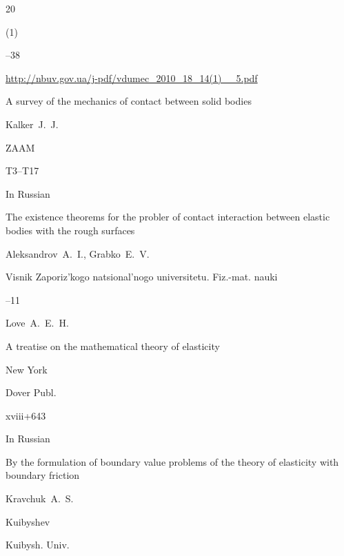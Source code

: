 \begin{thebibliography}{20}


(1)

--38

\elink \url{http://nbuv.gov.ua/j-pdf/vdumec_2010_18_14(1)__5.pdf}






\paper A survey of the mechanics of contact between solid bodies

\by Kalker~J.~J.

\jour ZAAM




\pages T3--T17





\lang In Russian

\paper The existence theorems for the probler of contact interaction between elastic bodies with the rough surfaces

\by Aleksandrov~A.~I., Grabko~E.~V.

\jour Visnik Zaporiz'kogo natsional'nogo universitetu. Fiz.-mat. nauki



--11






\by Love~A.~E.~H.

\book A treatise on the mathematical theory of elasticity

\publaddr New York

\publ Dover Publ.

\totalpages  xviii+643 





\lang In Russian

\paper By the formulation of boundary value problems of the theory of elasticity with boundary friction

\by Kravchuk~A.~S.

\publaddr Kuibyshev

\publ Kuibysh. Univ.


\end{thebibliography}
